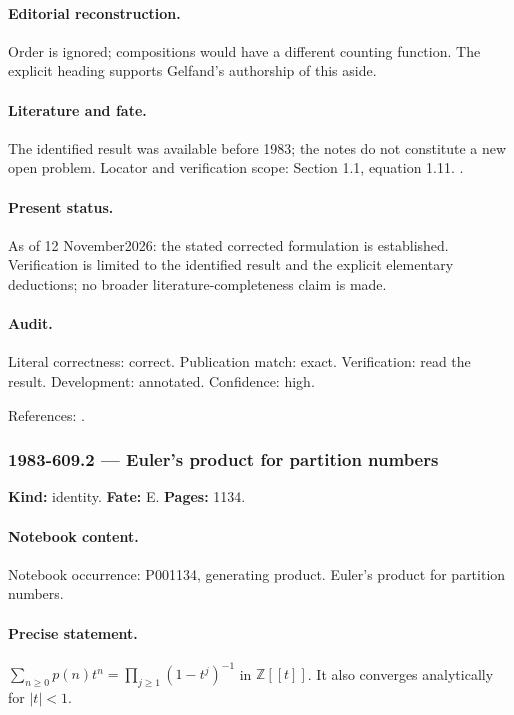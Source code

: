 \paragraph{Editorial reconstruction.} Order is ignored; compositions would have a different counting function. The explicit  heading supports Gelfand's authorship of this aside.

\paragraph{Literature and fate.} The identified result was available before 1983; the notes do not constitute a new open problem. Locator and verification scope: Section 1.1, equation 1.11. \cite{hardyramanujan1918asymptotic}.

\paragraph{Present status.} As of 12 November2026: the stated corrected formulation is established. Verification is limited to the identified result and the explicit elementary deductions; no broader literature-completeness claim is made.

\paragraph{Audit.} Literal correctness: correct. Publication match: exact. Verification: read the result. Development: annotated. Confidence: high.

\noindent References: \citep{hardyramanujan1918asymptotic}.\par

\subsubsection{1983-609.2 --- Euler's product for partition numbers}

\label{item:1983-609.2}

\noindent\textbf{Kind:} identity. \textbf{Fate:} E. \textbf{Pages:} 1134.\par

\paragraph{Notebook content.} Notebook occurrence: P001134, generating product. Euler's product for partition numbers.

\paragraph{Precise statement.} \(\sum_{n\ge0}p(n)t^n=\prod_{j\ge1}(1-t^j)^{-1}\) in \(\mathbb Z[[t]]\). It also converges analytically for \(|t|<1\).

